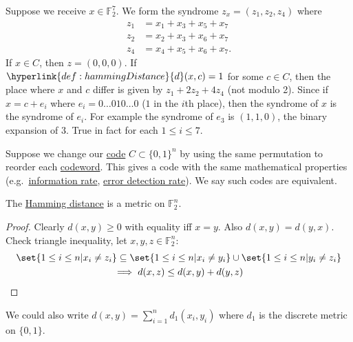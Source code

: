 \documentclass{article}
\newcommand{\1}[1]{\mathbbm{1}_{#1}}
\begin{document}
\begin{eg}
\begin{enumerate}[label=\arabic*.]
            Suppose we receive $x \in \mathbb{F}_2^7$. We form the syndrome $z_x = (z_1, z_2, z_4)$ where
            \begin{align*}
                z_1 &= x_1 + x_3 + x_5 + x_7 \\
                z_2 &= x_2 + x_3 + x_6 + x_7 \\
                z_4 &= x_4 + x_5 + x_6 + x_7.
            \end{align*}
            If $x \in C$, then $z = (0,0,0)$. If $\hyperlink{def:hammingDistance}{d}(x, c) = 1$ for some $c \in C$, then the place where $x$ and $c$ differ is given by $z_1 + 2 z_2 + 4z_4$ (not modulo 2).
            Since if $x = c+ e_i$ where $e_i = 0\dotso 010\dotso 0$ ($1$ in the $i$th place), then the syndrome of $x$ is the syndrome of $e_i$.
            For example the syndrome of $e_3$ is $(1, 1, 0)$, the binary expansion of $3$.
            True in fact for each $1 \leq i \leq 7$.
    \end{enumerate}
\end{eg}

\begin{remark}
    Suppose we change our \hyperlink{def:binaryCode}{code} $C \subset \{0, 1\}^n$ by using the same permutation to reorder each \hyperlink{def:binaryCode}{codeword}.
    This gives a code with the same mathematical properties (e.g.\ \hyperlink{def:infoRate}{information rate}, \hyperlink{def:errorDet}{error detection rate}).
    We say such codes are equivalent.
\end{remark}


\begin{nlemma}\label{lem:2.3}
    The \hyperlink{def:hammingDistance}{Hamming distance} is a metric on $\mathbb{F}_2^n$.
\end{nlemma}

\begin{proof}
    Clearly $d(x, y) \geq 0$ with equality iff $x=y$.
    Also $d(x, y) = d(y, x)$. Check triangle inequality, let $x, y, z \in \mathbb{F}_2^n$:
    \begin{gather*}
        \set{1 \leq i \leq n | x_i \neq z_i} \subseteq
        \set{1 \leq i \leq n | x_i \neq y_i} \cup
        \set{1 \leq i \leq n | y_i \neq z_i} \\
        \implies d(x, z) \leq d(x, y) + d(y, z) \qedhere
    \end{gather*}
\end{proof}
\begin{remark}
    We could also write $d(x, y) = \sum_{i=1}^n d_1(x_i, y_i)$ where $d_1$ is the discrete metric on $\{0, 1\}$.
\end{remark}
\end{document}
